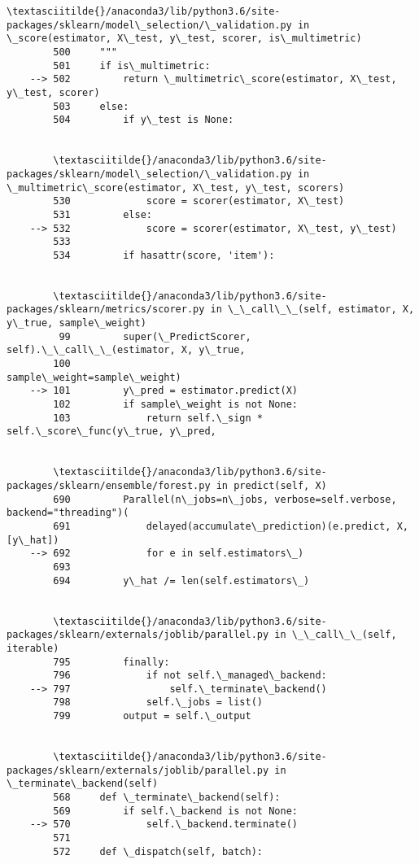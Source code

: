 \documentclass[11pt]{article}
\begin{document}
\begin{Verbatim}[commandchars=\\\{\}]
        \textasciitilde{}/anaconda3/lib/python3.6/site-packages/sklearn/model\_selection/\_validation.py in \_score(estimator, X\_test, y\_test, scorer, is\_multimetric)
        500     """
        501     if is\_multimetric:
    --> 502         return \_multimetric\_score(estimator, X\_test, y\_test, scorer)
        503     else:
        504         if y\_test is None:


        \textasciitilde{}/anaconda3/lib/python3.6/site-packages/sklearn/model\_selection/\_validation.py in \_multimetric\_score(estimator, X\_test, y\_test, scorers)
        530             score = scorer(estimator, X\_test)
        531         else:
    --> 532             score = scorer(estimator, X\_test, y\_test)
        533 
        534         if hasattr(score, 'item'):


        \textasciitilde{}/anaconda3/lib/python3.6/site-packages/sklearn/metrics/scorer.py in \_\_call\_\_(self, estimator, X, y\_true, sample\_weight)
         99         super(\_PredictScorer, self).\_\_call\_\_(estimator, X, y\_true,
        100                                              sample\_weight=sample\_weight)
    --> 101         y\_pred = estimator.predict(X)
        102         if sample\_weight is not None:
        103             return self.\_sign * self.\_score\_func(y\_true, y\_pred,


        \textasciitilde{}/anaconda3/lib/python3.6/site-packages/sklearn/ensemble/forest.py in predict(self, X)
        690         Parallel(n\_jobs=n\_jobs, verbose=self.verbose, backend="threading")(
        691             delayed(accumulate\_prediction)(e.predict, X, [y\_hat])
    --> 692             for e in self.estimators\_)
        693 
        694         y\_hat /= len(self.estimators\_)


        \textasciitilde{}/anaconda3/lib/python3.6/site-packages/sklearn/externals/joblib/parallel.py in \_\_call\_\_(self, iterable)
        795         finally:
        796             if not self.\_managed\_backend:
    --> 797                 self.\_terminate\_backend()
        798             self.\_jobs = list()
        799         output = self.\_output


        \textasciitilde{}/anaconda3/lib/python3.6/site-packages/sklearn/externals/joblib/parallel.py in \_terminate\_backend(self)
        568     def \_terminate\_backend(self):
        569         if self.\_backend is not None:
    --> 570             self.\_backend.terminate()
        571 
        572     def \_dispatch(self, batch):



\end{Verbatim}
\end{document}
